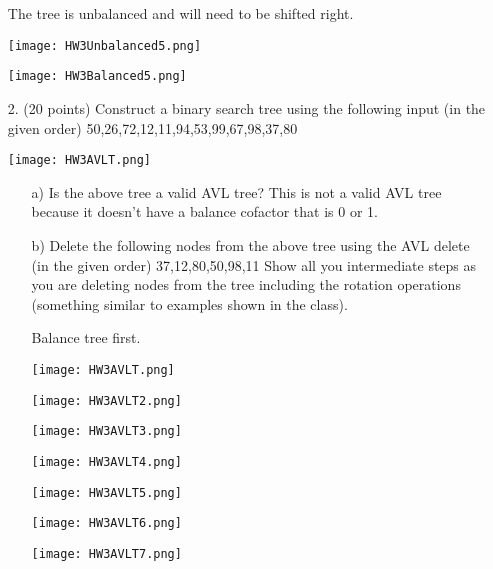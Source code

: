\documentclass{article}
\begin{document}
\begin{enumerate}
        The tree is unbalanced and will need to be shifted right.
        \begin{center}
            \texttt{[image: HW3Unbalanced5.png]}
        \end{center}
        \begin{center}
            \texttt{[image: HW3Balanced5.png]}
        \end{center}
        
        \item[2.] (20 points) Construct a binary search tree using the following input
        (in the given order) 50,26,72,12,11,94,53,99,67,98,37,80

        \begin{center}
            \texttt{[image: HW3AVLT.png]}
        \end{center}

        \begin{enumerate}
            \item[a)] Is the above tree a valid AVL tree? This is not a valid AVL tree because it doesn't
            have a balance cofactor that is 0 or 1.

            \item[b)] Delete the following nodes from the above tree using the AVL
            delete (in the given order) 37,12,80,50,98,11
            Show all you intermediate steps as you are deleting nodes from
            the tree including the rotation operations (something similar to
            examples shown in the class). 

            Balance tree first.
            \begin{center}
                \texttt{[image: HW3AVLT.png]}
            \end{center}
            \begin{center}
                \texttt{[image: HW3AVLT2.png]}
            \end{center}
            \begin{center}
                \texttt{[image: HW3AVLT3.png]}
            \end{center}
            \begin{center}
                \texttt{[image: HW3AVLT4.png]}
            \end{center}
            \begin{center}
                \texttt{[image: HW3AVLT5.png]}
            \end{center}
            \begin{center}
                \texttt{[image: HW3AVLT6.png]}
            \end{center}
            \begin{center}
                \texttt{[image: HW3AVLT7.png]}
            \end{center}


\end{enumerate}
\end{enumerate}
\end{document}
